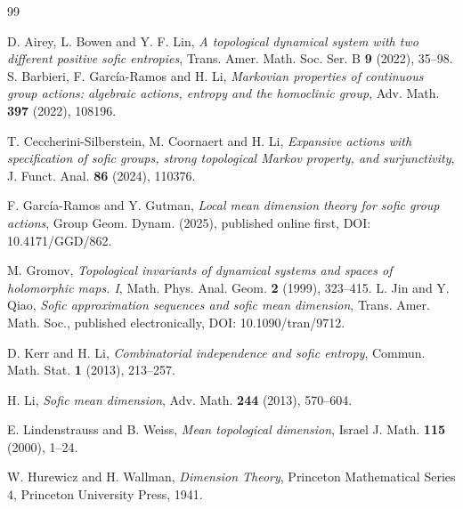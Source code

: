 \documentclass[12pt,a4paper]{amsart}
\theoremstyle{definition}
\begin{document}
	
	
	
	\begin{thebibliography}{99}
		
		D. Airey, L. Bowen and Y. F. Lin,
		\emph{A topological dynamical system with two different positive sofic entropies},
		Trans. Amer. Math. Soc. Ser. B \textbf{9} (2022), 35--98.
S. Barbieri, F. García-Ramos and H. Li, \emph{Markovian properties of continuous group actions: algebraic
actions, entropy and the homoclinic group}, 
Adv. Math. \textbf{397} (2022), 108196.

  T. Ceccherini-Silberstein, M. Coornaert and H. Li,
\emph{Expansive actions with specification of sofic groups,
strong topological Markov property, and
surjunctivity}, J. Funct. Anal. \textbf{86} (2024), 110376.

        
		  F. García-Ramos and Y. Gutman, \textit{Local mean dimension theory for sofic group actions}, Group Geom. Dynam. (2025), published online first,
		DOI: 10.4171/GGD/862.
	
		
		 M. Gromov, \textit{Topological invariants of dynamical systems and spaces of holomorphic maps. I}, Math. Phys. Anal. Geom. \textbf{2} (1999), 323–415.
		L. Jin and Y. Qiao,
		\emph{Sofic approximation sequences and sofic mean dimension},
		Trans. Amer. Math. Soc., published electronically,
		DOI: 10.1090/tran/9712.
		
		D. Kerr and H. Li,
		\emph{Combinatorial independence and sofic entropy},
		Commun. Math. Stat. \textbf{1} (2013), 213--257.
		
		H. Li,
		\emph{Sofic mean dimension},
		Adv. Math. \textbf{244} (2013), 570--604.
		
		E. Lindenstrauss and B. Weiss,
		\emph{Mean topological dimension},
		Israel J. Math. \textbf{115} (2000), 1--24.
		
		W. Hurewicz and H. Wallman,
		\emph{Dimension Theory},
		Princeton Mathematical Series 4, Princeton University Press, 1941.
		
	\end{thebibliography}
	
\end{document}
